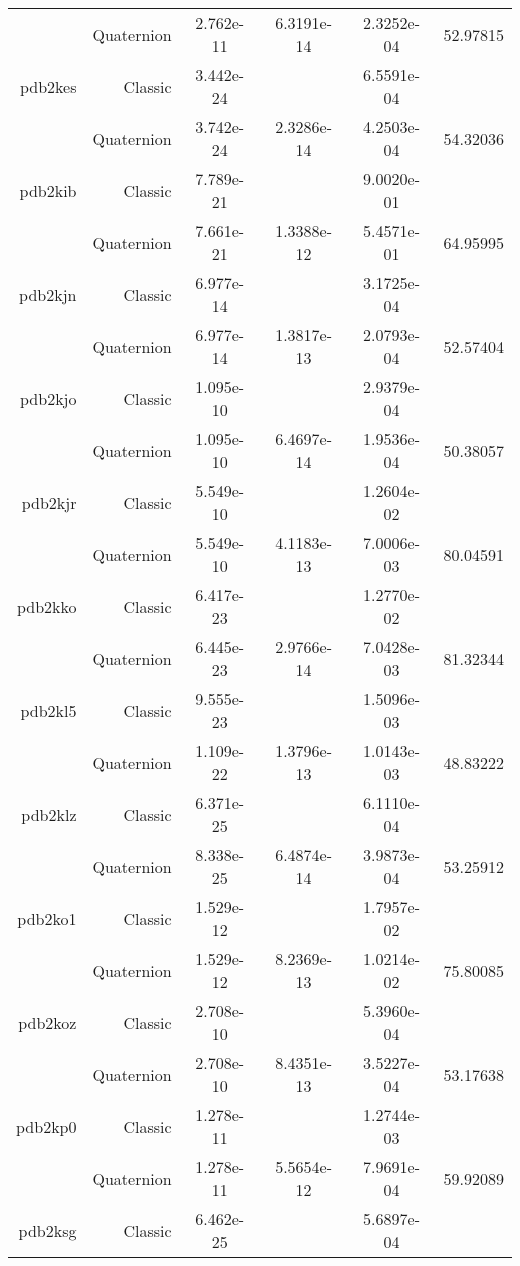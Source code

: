 \begin{xltabular}{\textwidth}{r|rS[table-format=1.3e+2]S[table-format=1.4e+2]S[table-format=1.4e+2]S[table-format=-1.5]}
& Quaternion & 2.762e-11 & 6.3191e-14 & 2.3252e-04 & 52.97815\\  \addlinespace
pdb2kes & Classic & 3.442e-24 &  & 6.5591e-04 & \\
& Quaternion & 3.742e-24 & 2.3286e-14 & 4.2503e-04 & 54.32036\\  \addlinespace
pdb2kib & Classic & 7.789e-21 &  & 9.0020e-01 & \\
& Quaternion & 7.661e-21 & 1.3388e-12 & 5.4571e-01 & 64.95995\\  \addlinespace
pdb2kjn & Classic & 6.977e-14 &  & 3.1725e-04 & \\
& Quaternion & 6.977e-14 & 1.3817e-13 & 2.0793e-04 & 52.57404\\  \addlinespace
pdb2kjo & Classic & 1.095e-10 &  & 2.9379e-04 & \\
& Quaternion & 1.095e-10 & 6.4697e-14 & 1.9536e-04 & 50.38057\\  \addlinespace
pdb2kjr & Classic & 5.549e-10 &  & 1.2604e-02 & \\
& Quaternion & 5.549e-10 & 4.1183e-13 & 7.0006e-03 & 80.04591\\  \addlinespace
pdb2kko & Classic & 6.417e-23 &  & 1.2770e-02 & \\
& Quaternion & 6.445e-23 & 2.9766e-14 & 7.0428e-03 & 81.32344\\  \addlinespace
pdb2kl5 & Classic & 9.555e-23 &  & 1.5096e-03 & \\
& Quaternion & 1.109e-22 & 1.3796e-13 & 1.0143e-03 & 48.83222\\  \addlinespace
pdb2klz & Classic & 6.371e-25 &  & 6.1110e-04 & \\
& Quaternion & 8.338e-25 & 6.4874e-14 & 3.9873e-04 & 53.25912\\  \addlinespace
pdb2ko1 & Classic & 1.529e-12 &  & 1.7957e-02 & \\
& Quaternion & 1.529e-12 & 8.2369e-13 & 1.0214e-02 & 75.80085\\  \addlinespace
pdb2koz & Classic & 2.708e-10 &  & 5.3960e-04 & \\
& Quaternion & 2.708e-10 & 8.4351e-13 & 3.5227e-04 & 53.17638\\  \addlinespace
pdb2kp0 & Classic & 1.278e-11 &  & 1.2744e-03 & \\
& Quaternion & 1.278e-11 & 5.5654e-12 & 7.9691e-04 & 59.92089\\  \addlinespace
pdb2ksg & Classic & 6.462e-25 &  & 5.6897e-04 & \\

\end{xltabular}
